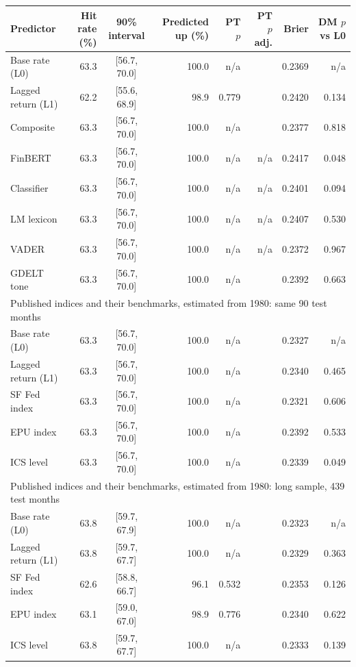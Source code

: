 \begin{tabular}{lrcrrrrr}
\toprule
Predictor & Hit rate (\%) & 90\% interval & Predicted up (\%) & PT $p$ & PT $p$ adj. & Brier & DM $p$ vs L0 \\
\midrule
Base rate (L0) & 63.3 & [56.7, 70.0] & 100.0 & n/a &  & 0.2369 & n/a \\
Lagged return (L1) & 62.2 & [55.6, 68.9] & 98.9 & 0.779 &  & 0.2420 & 0.134 \\
\midrule
Composite & 63.3 & [56.7, 70.0] & 100.0 & n/a &  & 0.2377 & 0.818 \\
FinBERT & 63.3 & [56.7, 70.0] & 100.0 & n/a & n/a & 0.2417 & 0.048 \\
Classifier & 63.3 & [56.7, 70.0] & 100.0 & n/a & n/a & 0.2401 & 0.094 \\
LM lexicon & 63.3 & [56.7, 70.0] & 100.0 & n/a & n/a & 0.2407 & 0.530 \\
VADER & 63.3 & [56.7, 70.0] & 100.0 & n/a & n/a & 0.2372 & 0.967 \\
GDELT tone & 63.3 & [56.7, 70.0] & 100.0 & n/a &  & 0.2392 & 0.663 \\
\midrule
\multicolumn{8}{l}{Published indices and their benchmarks, estimated from 1980: same 90 test months} \\
Base rate (L0) & 63.3 & [56.7, 70.0] & 100.0 & n/a &  & 0.2327 & n/a \\
Lagged return (L1) & 63.3 & [56.7, 70.0] & 100.0 & n/a &  & 0.2340 & 0.465 \\
SF Fed index & 63.3 & [56.7, 70.0] & 100.0 & n/a &  & 0.2321 & 0.606 \\
EPU index & 63.3 & [56.7, 70.0] & 100.0 & n/a &  & 0.2392 & 0.533 \\
ICS level & 63.3 & [56.7, 70.0] & 100.0 & n/a &  & 0.2339 & 0.049 \\
\midrule
\multicolumn{8}{l}{Published indices and their benchmarks, estimated from 1980: long sample, 439 test months} \\
Base rate (L0) & 63.8 & [59.7, 67.9] & 100.0 & n/a &  & 0.2323 & n/a \\
Lagged return (L1) & 63.8 & [59.7, 67.7] & 100.0 & n/a &  & 0.2329 & 0.363 \\
SF Fed index & 62.6 & [58.8, 66.7] & 96.1 & 0.532 &  & 0.2353 & 0.126 \\
EPU index & 63.1 & [59.0, 67.0] & 98.9 & 0.776 &  & 0.2340 & 0.622 \\
ICS level & 63.8 & [59.7, 67.7] & 100.0 & n/a &  & 0.2333 & 0.139 \\
\bottomrule
\end{tabular}
